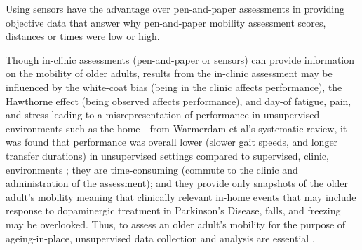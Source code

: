 Using sensors have the advantage over pen-and-paper assessments in providing objective data that answer 
why pen-and-paper mobility assessment scores, distances or times were low or high.

Though in-clinic assessments (pen-and-paper or sensors) can provide information on the mobility of 
older adults, results from the in-clinic assessment may be influenced by the white-coat bias 
(being in the clinic affects performance), the Hawthorne effect (being observed affects performance), 
and day-of fatigue, pain, and stress \cite{warmerdam_long-term_2020} leading to a misrepresentation of performance in unsupervised 
environments such as the home—from Warmerdam et al’s systematic review, it was found that performance 
was overall lower (slower gait speeds, and longer transfer durations) in unsupervised settings compared 
to supervised, clinic, environments \cite{warmerdam_long-term_2020}; they are time-consuming (commute to the clinic and 
administration of the assessment); and they provide only snapshots of the older adult's mobility 
meaning that clinically relevant in-home events that may include response to dopaminergic treatment 
in Parkinson’s Disease, falls, and freezing \cite{warmerdam_long-term_2020,rast_systematic_2020} may be overlooked. Thus, to assess an older 
adult’s mobility for the purpose of ageing-in-place, unsupervised data collection and analysis are 
essential \cite{warmerdam_long-term_2020,fasano_wearable-based_2020}.

